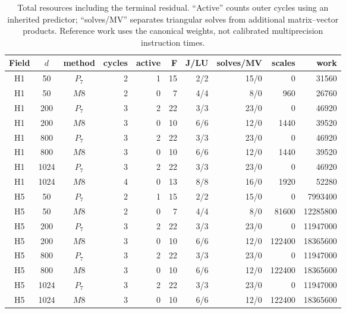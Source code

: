 \begin{table}[htbp]
\centering\scriptsize
\setlength{\tabcolsep}{3pt}
\caption{Total resources including the terminal residual. ``Active'' counts outer cycles using an inherited predictor; ``solves/MV'' separates triangular solves from additional matrix--vector products. Reference work uses the canonical weights, not calibrated multiprecision instruction times.}\label{tab:ext-res-external8}
\begin{tabular}{cccrrrrrrr}\toprule
Field & $d$ & method & cycles & active & F & J/LU & solves/MV & scales & work\\\midrule
H1 & 50 & $P_{7}$ & 2 & 1 & 15 & 2/2 & 15/0 & 0 & 31560\\
H1 & 50 & $M8$ & 2 & 0 & 7 & 4/4 & 8/0 & 960 & 26760\\
H1 & 200 & $P_{7}$ & 3 & 2 & 22 & 3/3 & 23/0 & 0 & 46920\\
H1 & 200 & $M8$ & 3 & 0 & 10 & 6/6 & 12/0 & 1440 & 39520\\
H1 & 800 & $P_{7}$ & 3 & 2 & 22 & 3/3 & 23/0 & 0 & 46920\\
H1 & 800 & $M8$ & 3 & 0 & 10 & 6/6 & 12/0 & 1440 & 39520\\
H1 & 1024 & $P_{7}$ & 3 & 2 & 22 & 3/3 & 23/0 & 0 & 46920\\
H1 & 1024 & $M8$ & 4 & 0 & 13 & 8/8 & 16/0 & 1920 & 52280\\
H5 & 50 & $P_{7}$ & 2 & 1 & 15 & 2/2 & 15/0 & 0 & 7993400\\
H5 & 50 & $M8$ & 2 & 0 & 7 & 4/4 & 8/0 & 81600 & 12285800\\
H5 & 200 & $P_{7}$ & 3 & 2 & 22 & 3/3 & 23/0 & 0 & 11947000\\
H5 & 200 & $M8$ & 3 & 0 & 10 & 6/6 & 12/0 & 122400 & 18365600\\
H5 & 800 & $P_{7}$ & 3 & 2 & 22 & 3/3 & 23/0 & 0 & 11947000\\
H5 & 800 & $M8$ & 3 & 0 & 10 & 6/6 & 12/0 & 122400 & 18365600\\
H5 & 1024 & $P_{7}$ & 3 & 2 & 22 & 3/3 & 23/0 & 0 & 11947000\\
H5 & 1024 & $M8$ & 3 & 0 & 10 & 6/6 & 12/0 & 122400 & 18365600\\
\bottomrule\end{tabular}
\end{table}
\FloatBarrier
